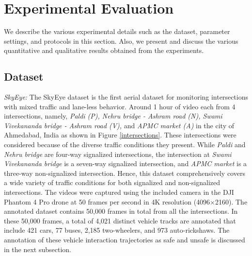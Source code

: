 \documentclass[final,journal]{IEEEtran}
\begin{document}
\section{Experimental Evaluation}\label{experiment}
We describe the various experimental details such as the dataset, parameter settings, and protocols in this section. Also, we present and discuss the various quantitative and qualitative results obtained from the experiments. 

\subsection{Dataset}
\textit{SkyEye:} The SkyEye dataset is the first aerial dataset for monitoring intersections with mixed traffic and lane-less behavior. Around 1 hour of video each from 4 intersections, namely, \textit{Paldi (P), Nehru bridge - Ashram road (N), Swami Vivekananda bridge - Ashram road (V),} and \textit{APMC market (A)} in the city of Ahmedabad, India as shown in Figure \ref{intersections}. These intersections were considered because of the diverse traffic conditions they present. While  \textit{Paldi} and \textit{Nehru bridge } are four-way signalized intersections, the intersection at \textit{Swami Vivekananda bridge} is a seven-way signalized intersection, and \textit{APMC market} is a three-way non-signalized intersection. Hence, this dataset comprehensively covers a wide variety of traffic conditions for both signalized and non-signalized intersections. The videos were captured using the included camera in the DJI Phantom 4 Pro drone at 50 frames per second in 4K resolution (4096$\times$2160). The annotated dataset contains 50,000 frames in total from all the intersections. In these 50,000 frames, a total of 4,021 distinct vehicle tracks are annotated that include 421 cars, 77 buses, 2,185 two-wheelers, and 973 auto-rickshaws. The annotation of these vehicle interaction trajectories as safe and unsafe is discussed in the next subsection.
\end{document}
